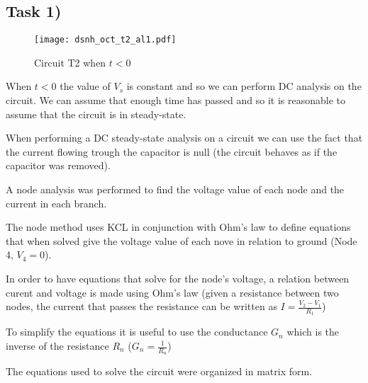\subsection{Task 1)}
\label{subsec:task1_a}

\begin{figure}[ht]
	\centering
	\texttt{[image: dsnh\_oct\_t2\_al1.pdf]}
	\caption{Circuit T2 when $t<0$}
\label{fig:Dsnh_sim_t2}
\end{figure}

When $t<0$ the value of $V_s$ is constant and so we can perform DC analysis on the circuit. We can assume that enough time has passed and so it is reasonable to assume that the circuit is in steady-state.

When performing a DC steady-state analysis on a circuit we can use the fact that the current flowing trough the capacitor is null (the circuit behaves as if the capacitor was removed).

A node analysis was performed to find the voltage value of each node and the current in each branch.

The node method uses KCL in conjunction with Ohm’s law to define equations that when solved give the voltage value 
of each nove in relation to ground (Node 4, $V_4 = 0$). 

In order to have equations that solve for the node’s voltage, a relation between curent and voltage is made using 
Ohm’s law (given a resistance between two nodes, the current that passes the resistance can be written as 
$I=\frac{V_2-V_1}{R_1}$)

To simplify the equations it is useful to use the conductance $G_n$ which is the inverse of the resistance $R_n$ 
($G_n=\frac{1}{R_n}$)

The equations used to solve the circuit were organized in matrix form.

